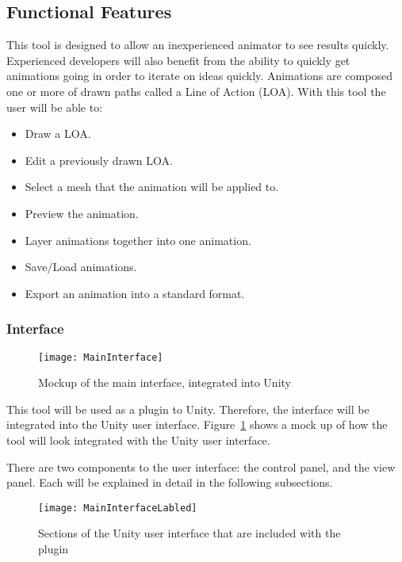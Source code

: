 \subsection{Functional Features}
	This tool is designed to allow an inexperienced animator to see results quickly.  Experienced developers will also benefit from the ability to quickly get animations going in order to iterate on ideas quickly.  
	Animations are composed one or more of drawn paths called a Line of Action (LOA).  With this tool the user will be able to:
\begin{itemize}
	\item Draw a LOA.
	\item Edit a previously drawn LOA.
	\item Select a mesh that the animation will be applied to.
	\item Preview the animation.
	\item Layer animations together into one animation.
	\item Save/Load animations.
	\item Export an animation into a standard format.
\end{itemize}
\subsubsection{Interface}
\begin{figure}[H]
\centering
\texttt{[image: MainInterface]}
\caption{Mockup of the main interface, integrated into Unity}
\label{fig:interface}
\end{figure}
This tool will be used as a plugin to Unity.  Therefore, the interface will be integrated into the Unity user interface.  Figure~\ref{fig:interface} shows a mock up of how the tool will look integrated with the Unity user interface.

There are two components to the user interface: the control panel, and the view panel.  Each will be explained in detail in the following subsections.
\begin{figure}[H]
\centering
\texttt{[image: MainInterfaceLabled]}
\caption{Sections of the Unity user interface that are included with the plugin}
\label{fig:interfaceLabled}
\end{figure}
